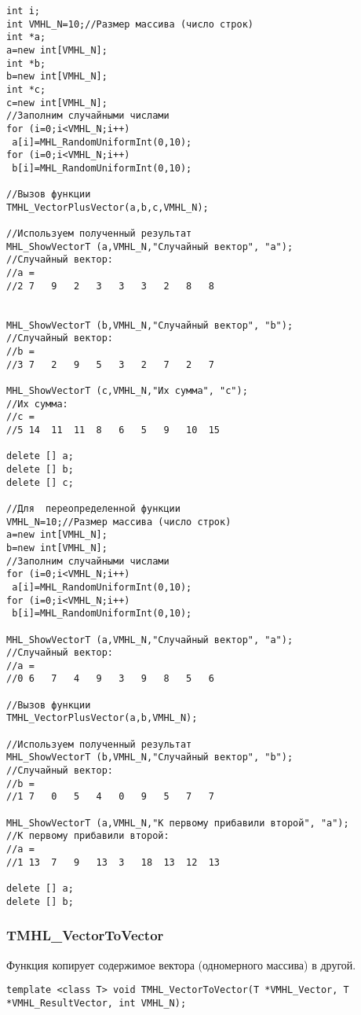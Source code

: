 \documentclass[a4paper,12pt]{article}
\begin{document}
\begin{lstlisting}[label=code_use_TMHL_VectorPlusVector,caption=Пример использования]
int i;
int VMHL_N=10;//Размер массива (число строк)
int *a;
a=new int[VMHL_N];
int *b;
b=new int[VMHL_N];
int *c;
c=new int[VMHL_N];
//Заполним случайными числами
for (i=0;i<VMHL_N;i++)
 a[i]=MHL_RandomUniformInt(0,10);
for (i=0;i<VMHL_N;i++)
 b[i]=MHL_RandomUniformInt(0,10);

//Вызов функции
TMHL_VectorPlusVector(a,b,c,VMHL_N);

//Используем полученный результат
MHL_ShowVectorT (a,VMHL_N,"Случайный вектор", "a");
//Случайный вектор:
//a =
//2	7	9	2	3	3	3	2	8	8


MHL_ShowVectorT (b,VMHL_N,"Случайный вектор", "b");
//Случайный вектор:
//b =
//3	7	2	9	5	3	2	7	2	7

MHL_ShowVectorT (c,VMHL_N,"Их сумма", "c");
//Их сумма:
//c =
//5	14	11	11	8	6	5	9	10	15

delete [] a;
delete [] b;
delete [] c;

//Для  переопределенной функции
VMHL_N=10;//Размер массива (число строк)
a=new int[VMHL_N];
b=new int[VMHL_N];
//Заполним случайными числами
for (i=0;i<VMHL_N;i++)
 a[i]=MHL_RandomUniformInt(0,10);
for (i=0;i<VMHL_N;i++)
 b[i]=MHL_RandomUniformInt(0,10);

MHL_ShowVectorT (a,VMHL_N,"Случайный вектор", "a");
//Случайный вектор:
//a =
//0	6	7	4	9	3	9	8	5	6

//Вызов функции
TMHL_VectorPlusVector(a,b,VMHL_N);

//Используем полученный результат
MHL_ShowVectorT (b,VMHL_N,"Случайный вектор", "b");
//Случайный вектор:
//b =
//1	7	0	5	4	0	9	5	7	7

MHL_ShowVectorT (a,VMHL_N,"К первому прибавили второй", "a");
//К первому прибавили второй:
//a =
//1	13	7	9	13	3	18	13	12	13

delete [] a;
delete [] b;
\end{lstlisting}

\subsubsection{TMHL\_VectorToVector}\label{TMHL_VectorToVector}

Функция копирует содержимое вектора (одномерного массива) в другой.


\begin{lstlisting}[label=code_syntax_TMHL_VectorToVector,caption=Синтаксис]
template <class T> void TMHL_VectorToVector(T *VMHL_Vector, T *VMHL_ResultVector, int VMHL_N);
\end{lstlisting}
\end{document}
